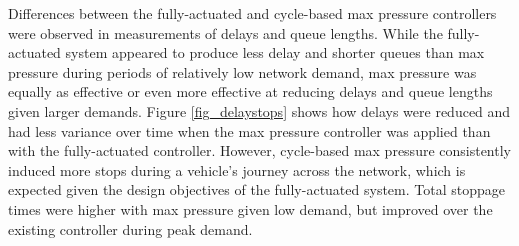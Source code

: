 Differences between the fully-actuated and cycle-based max pressure controllers were observed in measurements of delays and queue lengths. While the fully-actuated system appeared to produce less delay and shorter queues than max pressure during periods of relatively low network demand, max pressure was equally as effective or even more effective at reducing delays and queue lengths given larger demands. Figure \ref{fig_delaystops} shows how delays were reduced and had less variance over time when the max pressure controller was applied than with the fully-actuated controller. 
However, cycle-based max pressure consistently induced more stops during a vehicle's journey across the network, which is expected given the design objectives of the fully-actuated system. Total stoppage times were higher with max pressure given low demand, but improved over the existing controller during peak demand. 



